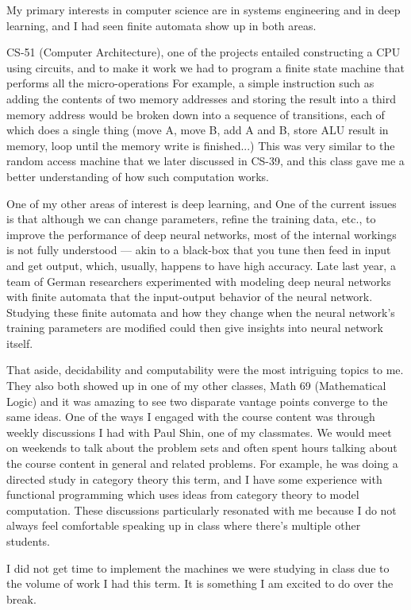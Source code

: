 \documentclass[11pt, reqno]{amsart}
\begin{document}
\setlength{\headheight}{13.0pt}
\setlength{\footskip}{13.0pt}



\bigskip

My primary interests in computer science are in systems engineering
and in deep learning, and I had seen finite automata show up in both
areas.

\begin{enumarabic}
  \item CS-51 (Computer Architecture), one of the projects
    entailed constructing a CPU using circuits, and to make it work we had
    to program a finite state machine that performs all the micro-operations
    For example, a simple instruction such as adding the contents
    of two memory addresses and storing the result into a third memory
    address would be broken down into a sequence of transitions,
    each of which does a single thing (move A, move B, add A and B,
    store ALU result in memory, loop until the memory write is finished...)
    This was very similar to the random access machine that
    we later discussed in CS-39, and this class gave me a better understanding
    of how such computation works.

 \item One of my other areas of interest is deep learning, and
    One of the current issues is that although we can
    change parameters, refine the training data, etc., to improve the
    performance of deep neural networks, most of the internal workings
    is not fully understood --- akin to a black-box that you tune then
    feed in input and get output, which, usually, happens to have high accuracy.
    Late last year, a team of German researchers experimented with modeling
    deep neural networks with finite automata that the input-output behavior
    of the neural network. Studying these finite automata and how
    they change when the neural network's training parameters are modified
    could then give insights into neural network itself.
\end{enumarabic}

That aside, decidability and computability were the most intriguing
topics to me. They also both showed up in one of my other classes,
Math 69 (Mathematical Logic) and it was amazing to see two disparate
vantage points converge to the same ideas.
One of the ways I engaged with the course content was through
weekly discussions I had with Paul Shin, one of my classmates.
We would  meet on weekends to talk about the problem sets and often spent
hours talking about the course content in general and related problems.
For example, he was doing a directed study in category theory this term,
and I have some experience with functional programming which uses ideas from
category theory to model computation.
These discussions particularly resonated with me because I do not always
feel comfortable speaking up in class where there's multiple other students.

I did not get time to implement the machines we were studying in class
due to the volume of work I had this term. It is something I am excited
to do over the break.
\vfill
\end{document}
